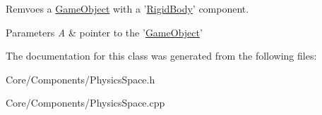 Remvoes a \hyperlink{classDCEngine_1_1GameObject}{Game\-Object} with a '\hyperlink{classDCEngine_1_1Components_1_1RigidBody}{Rigid\-Body}' component. 


\begin{DoxyParams}{Parameters}
{\em A} & pointer to the '\hyperlink{classDCEngine_1_1GameObject}{Game\-Object}' \\
\hline
\end{DoxyParams}


The documentation for this class was generated from the following files\-:\begin{DoxyCompactItemize}
\item 
Core/\-Components/Physics\-Space.\-h\item 
Core/\-Components/Physics\-Space.\-cpp\end{DoxyCompactItemize}
